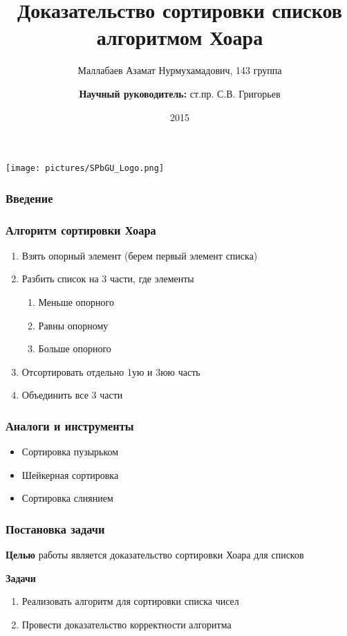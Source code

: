 \documentclass{beamer}
\title[]{Доказательство сортировки списков алгоритмом Хоара}
\institute[СПбГУ]{
Санкт-Петербургский государственный университет }
\author[Маллабаев Азамат]{Маллабаев Азамат Нурмухамадович, 143 группа \\
  \and
    {\bfseries Научный руководитель:} ст.пр. С.В. Григорьев \\
  }
\date{2015}
\begin{document}
{
\begin{frame}
  \begin{center}
  {\texttt{[image: pictures/SPbGU\_Logo.png]}}
  \end{center}
  \titlepage
\end{frame}
}

\begin{frame}[fragile]
  \transwipe[direction=90]
  \frametitle{Введение}
\end{frame}

\begin{frame}
  \transwipe[direction=90]
  \frametitle{Алгоритм сортировки Хоара}
  \begin{enumerate}
    \item Взять опорный элемент (берем первый элемент списка)
    \item Разбить список на 3 части, где элементы
    \begin{enumerate}
      \item Меньше опорного
      \item Равны опорному
      \item Больше опорного
    \end{enumerate}
    \item Отсортировать отдельно 1ую и 3юю часть
    \item Объединить все 3 части
  \end{enumerate}
\end{frame}

\begin{frame}
  \transwipe[direction=90]
  \frametitle{Аналоги и инструменты}
  \begin{itemize}
    \item Сортировка пузырьком
    \item Шейкерная сортировка
    \item Сортировка слиянием
  \end{itemize}
\end{frame}

\begin{frame}
  \transwipe[direction=90]
  \frametitle{Постановка задачи}
  \textbf{Целью} работы является доказательство сортировки Хоара для списков

  \textbf{Задачи}
  \begin{enumerate}
    \item Реализовать алгоритм для сортировки списка чисел
    \item Провести доказательство корректности алгоритма
  \end{enumerate}
\end{frame}
\end{document}
